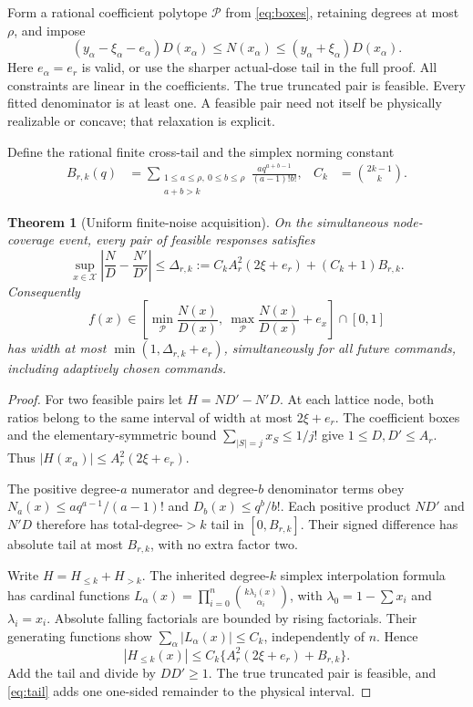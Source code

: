 \documentclass[10pt,a4paper]{article}
\newtheorem{theorem}{Theorem}
\newcommand{\X}{\mathcal X}
\newcommand{\Pset}{\mathcal P}
\begin{document}
Form a rational coefficient polytope $\Pset$ from \eqref{eq:boxes}, retaining
degrees at most $\rho$, and impose
\begin{equation}
 (y_\alpha-\xi_\alpha-e_\alpha)D(x_\alpha)
 \le N(x_\alpha)
 \le(y_\alpha+\xi_\alpha)D(x_\alpha).
 \label{eq:LP}
\end{equation}
Here $e_\alpha=e_r$ is valid, or use the sharper actual-dose tail in the full
proof. All constraints are linear in the coefficients. The true truncated pair
is feasible. Every fitted denominator is at least one. A feasible pair need
not itself be physically realizable or concave; that relaxation is explicit.

Define the rational finite cross-tail and the simplex norming constant
\begin{align}
 B_{r,k}(q)&=\sum_{\substack{1\le a\le\rho,\ 0\le b\le\rho\\a+b>k}}
 \frac{a q^{a+b-1}}{(a-1)!b!},
 & C_k&=\binom{2k-1}{k}.
\end{align}

\begin{theorem}[Uniform finite-noise acquisition]
On the simultaneous node-coverage event, every pair of feasible responses
satisfies
\begin{equation}
 \sup_{x\in\X}\left|\frac ND-\frac{N'}{D'}\right|
 \le \Delta_{r,k}:=C_k A_r^2(2\xi+e_r)+(C_k+1)B_{r,k}.
 \label{eq:main}
\end{equation}
Consequently
\begin{equation}
 f(x)\in\left[\min_{\Pset}\frac{N(x)}{D(x)},\
 \max_{\Pset}\frac{N(x)}{D(x)}+e_x\right]\cap[0,1]
 \label{eq:service}
\end{equation}
has width at most $\min(1,\Delta_{r,k}+e_r)$, simultaneously for all future
commands, including adaptively chosen commands.
\end{theorem}

\begin{proof}
For two feasible pairs let $H=ND'-N'D$. At each lattice node, both ratios
belong to the same interval of width at most $2\xi+e_r$. The coefficient boxes
and the elementary-symmetric bound $\sum_{|S|=j}x_S\le1/j!$ give
$1\le D,D'\le A_r$. Thus $|H(x_\alpha)|\le A_r^2(2\xi+e_r)$.

The positive degree-$a$ numerator and degree-$b$ denominator terms obey
$N_a(x)\le a q^{a-1}/(a-1)!$ and $D_b(x)\le q^b/b!$. Each positive product
$ND'$ and $N'D$ therefore has total-degree-$>k$ tail in $[0,B_{r,k}]$.
Their signed difference has absolute tail at most $B_{r,k}$, with no extra
factor two.

Write $H=H_{\le k}+H_{>k}$. The inherited degree-$k$ simplex interpolation
formula has cardinal functions
$L_\alpha(x)=\prod_{i=0}^n\binom{k\lambda_i(x)}{\alpha_i}$, with
$\lambda_0=1-\sum x_i$ and $\lambda_i=x_i$. Absolute falling factorials are
bounded by rising factorials. Their generating functions show
$\sum_\alpha|L_\alpha(x)|\le C_k$, independently of $n$. Hence
\[
 |H_{\le k}(x)|\le C_k\{A_r^2(2\xi+e_r)+B_{r,k}\}.
\]
Add the tail and divide by $DD'\ge1$. The true truncated pair is feasible, and
\eqref{eq:tail} adds one one-sided remainder to the physical interval.
\end{proof}
\end{document}
